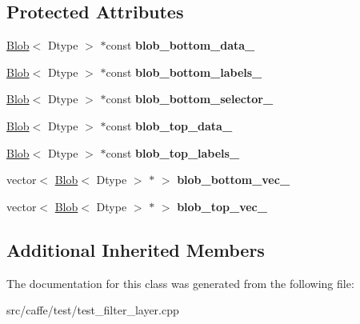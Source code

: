 \subsection*{Protected Attributes}
\begin{DoxyCompactItemize}
\item 
\mbox{\label{classcaffe_1_1_filter_layer_test_afa9d8c2818a1139a6f5b4ffdfa89c91f}} 
\mbox{\hyperlink{classcaffe_1_1_blob}{Blob}}$<$ Dtype $>$ $\ast$const {\bfseries blob\+\_\+bottom\+\_\+data\+\_\+}
\item 
\mbox{\label{classcaffe_1_1_filter_layer_test_adf8cc90f40fc50e26501ba37e00584de}} 
\mbox{\hyperlink{classcaffe_1_1_blob}{Blob}}$<$ Dtype $>$ $\ast$const {\bfseries blob\+\_\+bottom\+\_\+labels\+\_\+}
\item 
\mbox{\label{classcaffe_1_1_filter_layer_test_a505b937b29732169d54404da2703aca0}} 
\mbox{\hyperlink{classcaffe_1_1_blob}{Blob}}$<$ Dtype $>$ $\ast$const {\bfseries blob\+\_\+bottom\+\_\+selector\+\_\+}
\item 
\mbox{\label{classcaffe_1_1_filter_layer_test_af9546bc2e22deb15c75e7611591eacda}} 
\mbox{\hyperlink{classcaffe_1_1_blob}{Blob}}$<$ Dtype $>$ $\ast$const {\bfseries blob\+\_\+top\+\_\+data\+\_\+}
\item 
\mbox{\label{classcaffe_1_1_filter_layer_test_a3ac54b98a29693ffc7264a24c5999a47}} 
\mbox{\hyperlink{classcaffe_1_1_blob}{Blob}}$<$ Dtype $>$ $\ast$const {\bfseries blob\+\_\+top\+\_\+labels\+\_\+}
\item 
\mbox{\label{classcaffe_1_1_filter_layer_test_af9b083ccf1e7199aa6b2441f91f933ee}} 
vector$<$ \mbox{\hyperlink{classcaffe_1_1_blob}{Blob}}$<$ Dtype $>$ $\ast$ $>$ {\bfseries blob\+\_\+bottom\+\_\+vec\+\_\+}
\item 
\mbox{\label{classcaffe_1_1_filter_layer_test_a8cbfaf39aeeee91735a311e3583f8258}} 
vector$<$ \mbox{\hyperlink{classcaffe_1_1_blob}{Blob}}$<$ Dtype $>$ $\ast$ $>$ {\bfseries blob\+\_\+top\+\_\+vec\+\_\+}
\end{DoxyCompactItemize}
\subsection*{Additional Inherited Members}


The documentation for this class was generated from the following file\+:\begin{DoxyCompactItemize}
\item 
src/caffe/test/test\+\_\+filter\+\_\+layer.\+cpp\end{DoxyCompactItemize}
